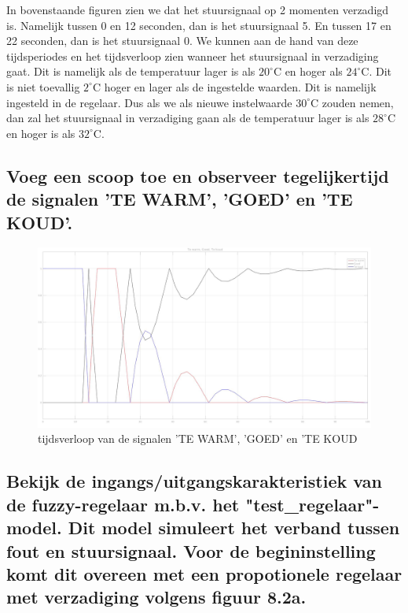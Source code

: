 \documentclass[a4paper, 12pt]{article}
\begin{document}
In bovenstaande figuren zien we dat het stuursignaal op 2 momenten verzadigd is. Namelijk tussen 0 en 12 seconden, dan is het stuursignaal 5. En tussen 17 en 22 seconden, dan is het stuursignaal 0. We kunnen aan de hand van deze tijdsperiodes en het tijdsverloop zien wanneer het stuursignaal in verzadiging gaat. Dit is namelijk als de temperatuur lager is als $20^\circ$C en hoger als $24^\circ$C. Dit is niet toevallig $2^\circ$C hoger en lager als de ingestelde waarden. Dit is namelijk ingesteld in de regelaar. Dus als we als nieuwe instelwaarde $30^\circ$C zouden nemen, dan zal het stuursignaal in verzadiging gaan als de temperatuur lager is als $28^\circ$C en hoger is als $32^\circ$C.

\subsection{Voeg een scoop toe en observeer tegelijkertijd de signalen 'TE WARM', 'GOED' en 'TE KOUD'.}

\begin{figure}[!h]
	\includegraphics[width=1\linewidth]{Labo4_1_signals.jpg}
	\caption{tijdsverloop van de signalen 'TE WARM', 'GOED' en 'TE KOUD}
\end{figure}

\newpage

\subsection{Bekijk de ingangs/uitgangskarakteristiek van de fuzzy-regelaar m.b.v. het "test\_regelaar"-model. Dit model simuleert het verband tussen fout en stuursignaal. Voor de begininstelling komt dit overeen met een propotionele regelaar met verzadiging volgens figuur 8.2a.}
\end{document}

